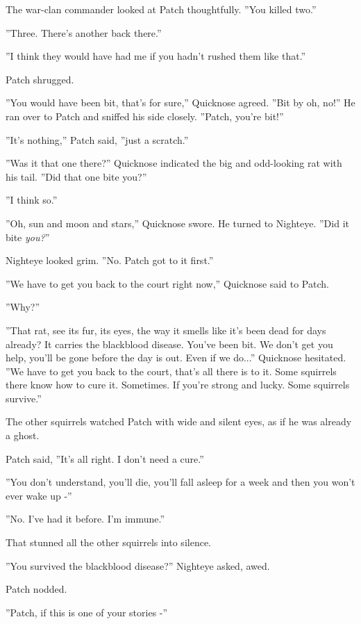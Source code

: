 \documentclass[11pt]{article}
\begin{document}
 The war-clan commander looked at Patch thoughtfully. ''You killed two.''\par
 ''Three. There's another back there.''\par
 ''I think they would have had me if you hadn't rushed them like that.''\par
 Patch shrugged.\par
 ''You would have been bit, that's for sure,'' Quicknose agreed. ''Bit by %
 oh, no!'' He ran over to Patch and sniffed his side closely. ''Patch, you're bit!''\par
 ''It's nothing,'' Patch said, ''just a scratch.''\par
 ''Was it that one there?'' Quicknose indicated the big and odd-looking rat with his tail. ''Did that one bite you?''\par
 ''I think so.''\par
 ''Oh, sun and moon and stars,'' Quicknose swore. He turned to Nighteye. ''Did it bite {\it you?}''\par
 Nighteye looked grim. ''No. Patch got to it first.''\par
 ''We have to get you back to the court right now,'' Quicknose said to Patch.\par
 ''Why?''\par
 ''That rat, see its fur, its eyes, the way it smells like it's been dead for days already? It carries the blackblood disease. You've been bit. We don't get you help, you'll be gone before the day is out. Even if we do...'' Quicknose hesitated. ''We have to get you back to the court, that's all there is to it. Some squirrels there know how to cure it. Sometimes. If you're strong and lucky. Some squirrels survive.''\par
 The other squirrels watched Patch with wide and silent eyes, as if he was already a ghost.\par
 Patch said, ''It's all right. I don't need a cure.''\par
 ''You don't understand, you'll die, you'll fall asleep for a week and then you won't ever wake up -''\par
 ''No. I've had it before. I'm immune.''\par
 That stunned all the other squirrels into silence.\par
 ''You survived the blackblood disease?'' Nighteye asked, awed.\par
 Patch nodded.\par
 ''Patch, if this is one of your stories -''\par
\end{document}
